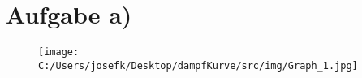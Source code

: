 \section{Aufgabe a)}
\begin{figure}[H]
    \texttt{[image: C:/Users/josefk/Desktop/dampfKurve/src/img/Graph\_1.jpg]}
\end{figure}

\clearpage